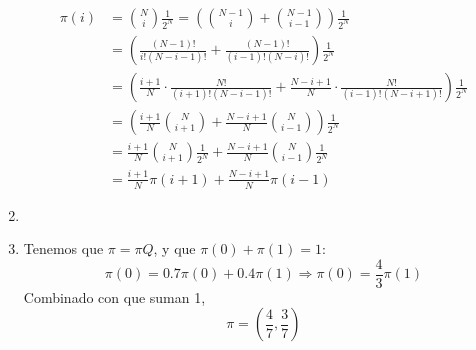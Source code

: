 \begin{enumerate}
		\begin{align*}
			\pi(i)	& = \binom{N}{i} \frac{1}{2^N} = \left(\binom{N-1}{i} + \binom{N-1}{i-1}\right) \frac{1}{2^N}						\\
					& = \left(\frac{(N-1)!}{i!(N-i-1)!} + \frac{(N-1)!}{(i-1)!(N-i)!}\right) \frac{1}{2^N}								\\
					& = \left(\frac{i+1}{N}\cdot\frac{N!}{(i+1)!(N-i-1)!} + \frac{N-i+1}{N}\cdot\frac{N!}{(i-1)!(N-i+1)!}\right) \frac{1}{2^N}	\\
					& = \left(\frac{i+1}{N}\binom{N}{i+1} + \frac{N-i+1}{N}\binom{N}{i-1}\right) \frac{1}{2^N}							\\
					& = \frac{i+1}{N}\binom{N}{i+1}\frac{1}{2^N} + \frac{N-i+1}{N}\binom{N}{i-1}\frac{1}{2^N}							\\
					& = \frac{i+1}{N}\pi(i+1) + \frac{N-i+1}{N}\pi(i-1)
		\end{align*}
	
	\item
		
	\item
		Tenemos que $\pi = \pi Q$, y que $\pi(0) + \pi(1) = 1$:
		$$\pi(0) = 0.7\pi(0) + 0.4\pi(1) \Rightarrow \pi(0) = \frac{4}{3}\pi(1)$$
		Combinado con que suman 1, $$\pi = \left(\frac{4}{7}, \frac{3}{7}\right)$$
\end{enumerate}

